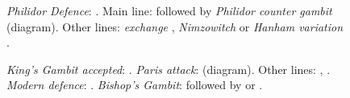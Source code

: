 \begin{figure}[H]
\begin{minipage}[b]{.196\linewidth}
\begin{framed}
\begin{center}
\end{center}
\end{framed}
\end{minipage}
\begin{minipage}[b]{.196\linewidth}
\begin{framed}
\raggedright
\newgame
\emph{Philidor Defence}: .
Main line:  followed by \emph{Philidor counter gambit}  (diagram).
Other lines: \emph{exchange} , \emph{Nimzowitch}  or \emph{Hanham variation} .\begin{center}
\scalebox{.560}{\showboard}
\end{center}
\end{framed}
\end{minipage}
\begin{minipage}[b]{.196\linewidth}
\begin{framed}
\raggedright
\newgame
\emph{King's Gambit accepted}: .
\emph{Paris attack}:  (diagram).
Other lines: , .
\emph{Modern defence}: .
\emph{Bishop's Gambit}:  followed by  or .
\begin{center}
\scalebox{.560}{\showboard}
\end{center}
\end{framed}
\end{minipage}
\end{figure}

